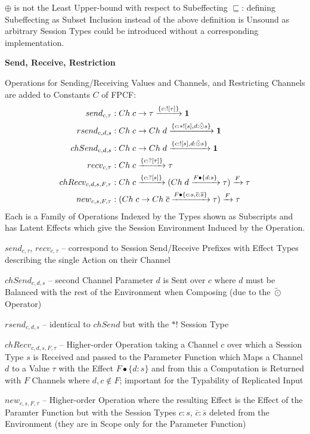 \fist $\oplus$ is not the Least Upper-bound with respect to
Subeffecting $\sqsubseteq$: defining Subeffecting as Subset Inclusion
instead of the above definition is Unsound as arbitrary Session Types
could be introduced without a corresponding implementation.


\textbf{Send, Receive, Restriction}

Operations for Sending/Receiving Values and Channels, and Restricting
Channels are added to Constants $C$ of FPCF:
\begin{align*}
  send_{c,\tau} &:
    Ch\;c \rightarrow \tau \xrightarrow{\{c:![\tau]\}} \mathbf{1} \\
  rsend_{c,d,s} &:
    Ch\;c \rightarrow
      Ch\;d \xrightarrow{\{c:*![s],d:\tilde{\odot}s\}} \mathbf{1} \\
  chSend_{c,d,s} &:
    Ch\;c \rightarrow
      Ch\;d \xrightarrow{\{c:![s],d:\tilde{\odot}s\}} \mathbf{1} \\
  recv_{c,\tau} &: Ch\;c \xrightarrow{\{c:?[\tau]\}} \tau \\
  chRecv_{c,d,s,F,\tau} &:
    Ch\;c \xrightarrow{\{c:?[s]\}}
      (Ch\;d \xrightarrow{F \bullet \{d:s\}} \tau)
    \xrightarrow{F} \tau \\
  new_{c,s,F,\tau} &:
    (Ch\;c \rightarrow Ch\;\overline{c}
      \xrightarrow{F \bullet \{c:s,\overline{c}:\overline{s}\}} \tau)
    \xrightarrow{F} \tau
\end{align*}
Each is a Family of Operations Indexed by the Types shown as Subscripts
and has Latent Effects which give the Session Environment Induced by
the Operation.

$send_{c,\tau}$, $recv_{c,\tau}$ -- correspond to Session Send/Receive
Prefixes with Effect Types describing the single Action on their
Channel

$chSend_{c,d,s}$ -- second Channel Parameter $d$ is Sent over $c$
where $d$ must be Balanced with the rest of the Environment when
Composing (due to the $\tilde{\odot}$ Operator)

$rsend_{c,d,s}$ -- identical to $chSend$ but with the
$*!$ Session Type

$chRecv_{c,d,s,F,\tau}$ -- Higher-order Operation taking a Channel $c$
over which a Session Type $s$ is Received and passed to the Parameter
Function which Maps a Channel $d$ to a Value $\tau$ with the Effect $F
\bullet \{d:s\}$ and from this a Computation is Returned with $F$
Channels where $d,c \notin F$; important for the Typability of
Replicated Input

$new_{c,s,F,\tau}$ -- Higher-order Operation where the resulting
Effect is the Effect of the Paramter Function but with the Session
Types $c:s$, $\overline{c}:\overline{s}$ deleted from the Environment
(they are in Scope only for the Parameter Function) %


